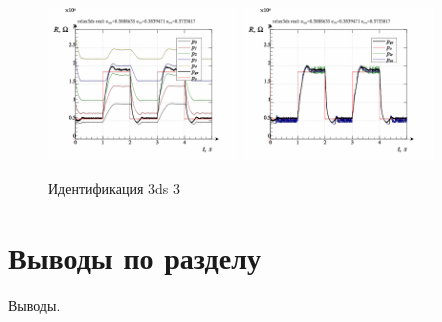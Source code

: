 \begin{figure}[htb!]
  \centerline{
    \includegraphics[width=0.45\textwidth]{p/relax3d_read_id2_3-p_p.png}
    \hfill
    \includegraphics[width=0.45\textwidth]{p/relax3d_read_id2_3-p_pp.png}
  }
  \caption{Идентификация 3ds 3}
  \label{atu:f:relax3ds_id_3}
\end{figure}

\section{Выводы по разделу \thechapter}

Выводы.


